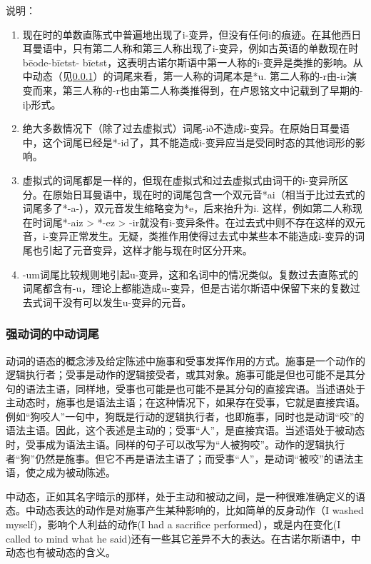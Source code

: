 说明：

\begin{enumerate}
  \def\labelenumi{\arabic{enumi})}
  \item
        现在时的单数直陈式中普遍地出现了i-变异，但没有任何i的痕迹。在其他西日耳曼语中，只有第二人称和第三人称出现了i-变异，例如古英语的单数现在时bēode-bīetst-
        bīetst，这表明古诺尔斯语中第一人称的i-变异是类推的影响。从中动态（见\ref{强动词的中动词尾}）的词尾来看，第一人称的词尾本是*u.
        第二人称的-r由-ir演变而来，第三人称的-r也由第二人称类推得到，在卢恩铭文中记载到了早期的-iþ形式。
  \item
        绝大多数情况下（除了过去虚拟式）词尾-ið不造成i-变异。在原始日耳曼语中，这个词尾已经是*-id了，其不能造成i-变异应当是受同时态的其他词形的影响。
  \item
        \label{_Ref116919964}{}虚拟式的词尾都是一样的，但现在虚拟式和过去虚拟式由词干的i-变异所区分。在原始日耳曼语中，现在时的词尾包含一个双元音*ai（相当于比过去式的词尾多了*-a-），双元音发生缩略变为*e，后来抬升为i.
        这样，例如第二人称现在时词尾*-aiz \textgreater{} *-ez \textgreater{}
        -ir就没有i-变异条件。在过去式中则不存在这样的双元音，i-变异正常发生。无疑，类推作用使得过去式中某些本不能造成i-变异的词尾也引起了元音变异，这样才能与现在时区分开来。
  \item
        -um词尾比较规则地引起u-变异，这和名词中的情况类似。复数过去直陈式的词尾都含有-u，理论上都能造成u-变异，但是古诺尔斯语中保留下来的复数过去式词干没有可以发生u-变异的元音。
\end{enumerate}

\subsubsection{强动词的中动词尾}\label{强动词的中动词尾}

动词的语态的概念涉及给定陈述中施事和受事发挥作用的方式。施事是一个动作的逻辑执行者；受事是动作的逻辑接受者，或其对象。施事可能是但也可能不是其分句的语法主语，同样地，受事也可能是也可能不是其分句的直接宾语。当述语处于主动态时，施事也是语法主语；在这种情况下，如果存在受事，它就是直接宾语。例如``狗咬人''一句中，狗既是行动的逻辑执行者，也即施事，同时也是动词``咬''的语法主语。因此，这个表述是主动的；受事``人''，是直接宾语。当述语处于被动态时，受事成为语法主语。同样的句子可以改写为``人被狗咬''。动作的逻辑执行者``狗''仍然是施事。但它不再是语法主语了；而受事``人''，是动词``被咬''的语法主语，使之成为被动陈述。

中动态，正如其名字暗示的那样，处于主动和被动之间，是一种很难准确定义的语态。中动态表达的动作是对施事产生某种影响的，比如简单的反身动作（I
washed myself‌)，影响个人利益的动作(I had a sacrifice
performed），或是内在变化(I called to mind what he
said)还有一些其它差异不大的表达。在古诺尔斯语中，中动态也有被动态的含义。

